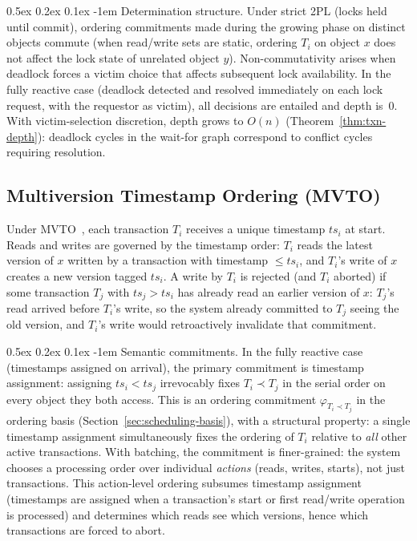 \documentclass[acmsmall,review,anonymous]{acmart}
\makeatletter
\renewcommand{\paragraph}{\@startsection{paragraph}{4}{\z@}%
  {0.5ex \@plus 0.2ex \@minus 0.1ex}%
  {-1em}%
  {\normalfont\normalsize\bfseries}}
\theoremstyle{remark}
\numberwithin{definition}{section}
\numberwithin{theorem}{section}
\numberwithin{lemma}{section}
\numberwithin{corollary}{section}
\numberwithin{remark}{section}
\numberwithin{example}{section}
\numberwithin{observation}{section}
\numberwithin{assumption}{section}
\makeatother
\begin{document}
\paragraph{Determination structure.}
Under strict 2PL (locks held until commit), ordering commitments
made during the growing phase on distinct objects commute (when
read/write sets are static, ordering $T_i$ on object $x$ does not
affect the lock state of unrelated object $y$).
Non-commutativity arises when deadlock forces a victim choice that
affects subsequent lock availability.
In the fully reactive case (deadlock detected and resolved immediately
on each lock request, with the requestor as victim), all decisions are
entailed and depth is~$0$.
With victim-selection discretion, depth grows to $O(n)$
(Theorem~\ref{thm:txn-depth}): deadlock cycles in the wait-for
graph correspond to conflict cycles requiring resolution.

\subsection{Multiversion Timestamp Ordering (MVTO)}

Under MVTO~\cite{reed1978naming}, each transaction $T_i$ receives a
unique timestamp $ts_i$ at start.
Reads and writes are governed by the timestamp order: $T_i$ reads the
latest version of $x$ written by a transaction with timestamp
$\le ts_i$, and $T_i$'s write of $x$ creates a new version tagged
$ts_i$.
A write by $T_i$ is rejected (and $T_i$ aborted) if some transaction
$T_j$ with $ts_j > ts_i$ has already read an earlier version of $x$:
$T_j$'s read arrived before $T_i$'s write, so the system already
committed to $T_j$ seeing the old version, and $T_i$'s write would
retroactively invalidate that commitment.

\paragraph{Semantic commitments.}
In the fully reactive case (timestamps assigned on arrival), the
primary commitment is timestamp assignment: assigning $ts_i < ts_j$
irrevocably fixes $T_i \prec T_j$ in the serial order on every object
they both access.
This is an ordering commitment $\varphi_{T_i \prec T_j}$ in the
ordering basis (Section~\ref{sec:scheduling-basis}), with a structural
property: a single timestamp assignment simultaneously fixes the
ordering of $T_i$ relative to \emph{all} other active transactions.
With batching, the commitment is finer-grained: the system chooses a
processing order over individual \emph{actions} (reads, writes, starts),
not just transactions.
This action-level ordering subsumes timestamp assignment (timestamps
are assigned when a transaction's start or first read/write operation is
processed) and determines which reads see which versions, hence which
transactions are forced to abort.
\end{document}
